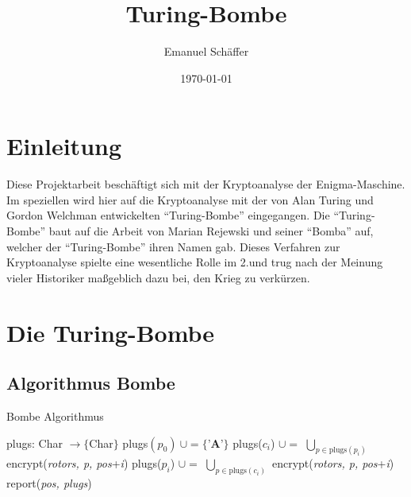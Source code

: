 \documentclass[ngerman, a4paper, footsepline, headsepline]{scrreport}
\begin{document}
	\subject{Kryptoanalyse der Enigma-Maschine durch eine Software-Nachbildung der Turing-Bombe}
	\title{Turing-Bombe}
	\author{Emanuel Schäffer}
	\date{\today}
	\publishers{RWU--University of Applied Sciences}
	\maketitle
	
	\tableofcontents
	
	
	\chapter{Einleitung}\label{ch:einleitung}
	Diese Projektarbeit beschäftigt sich mit der Kryptoanalyse der Enigma-Maschine.
	Im speziellen wird hier auf die Kryptoanalyse mit der von Alan Turing und Gordon Welchman entwickelten ``Turing-Bombe'' eingegangen.
	Die ``Turing-Bombe'' baut auf die Arbeit von Marian Rejewski und seiner ``Bomba'' auf, welcher der ``Turing-Bombe'' ihren Namen gab.
	Dieses Verfahren zur Kryptoanalyse spielte eine wesentliche Rolle im 2.\@Weltkrieg und trug nach der Meinung vieler Historiker maßgeblich dazu bei, den Krieg zu verkürzen.
	
	
	
	
	\chapter{Die Turing-Bombe}\label{ch:die-turing-bombe}

	\section{Algorithmus Bombe}\label{sec:algorithmus-bombe}

	\begin{algorithm}
		\caption{Bombe Algorithmus}
		\begin{algorithmic}[1]
			\State plugs: Char $\rightarrow \{ $Char$\}$
			\State plugs$(p_0)\ \cup= \{\textbf{'A'}\}$
			\State plugs($c_i$) $\cup=$ $\bigcup_{p \in \text{plugs}(p_i)}$ encrypt(\textsl{rotors, p, pos}+\textsl{i})
			\State plugs($p_i$) $\cup=$ $\bigcup_{p \in \text{plugs}(c_i)}$ encrypt(\textsl{rotors, p, pos}+\textsl{i})
			\EndFor
			\EndWhile
			\State report(\textsl{pos, plugs})
			\EndIf
			\EndFor
			\EndProcedure
		\end{algorithmic}\label{alg:algorithm}
	\end{algorithm}
	
\end{document}

